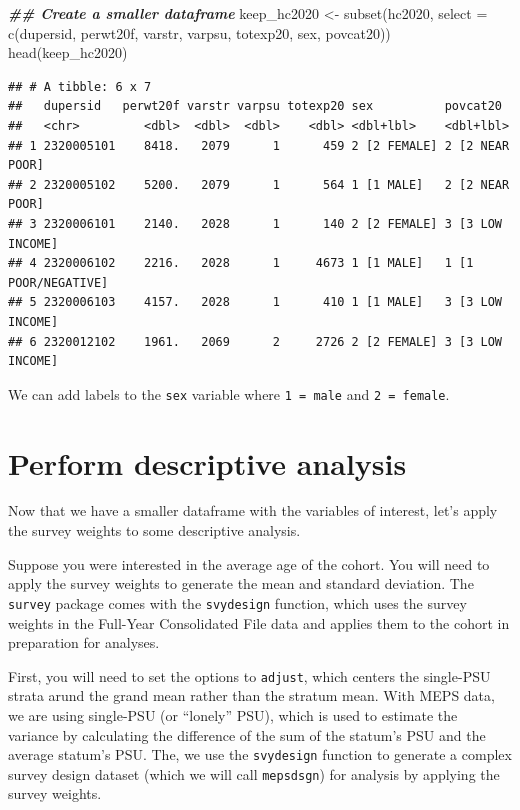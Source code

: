 \documentclass[
]{book}
\newenvironment{Shaded}{\begin{snugshade}}{\end{snugshade}}
\newcommand{\AttributeTok}[1]{\textcolor[rgb]{0.77,0.63,0.00}{#1}}
\newcommand{\DocumentationTok}[1]{\textcolor[rgb]{0.56,0.35,0.01}{\textbf{\textit{#1}}}}
\newcommand{\FunctionTok}[1]{\textcolor[rgb]{0.00,0.00,0.00}{#1}}
\newcommand{\NormalTok}[1]{#1}
\newcommand{\OtherTok}[1]{\textcolor[rgb]{0.56,0.35,0.01}{#1}}
\theoremstyle{definition}
\theoremstyle{definition}
\theoremstyle{definition}
\theoremstyle{definition}
\theoremstyle{remark}
\begin{document}
\begin{Shaded}
\begin{Highlighting}[]
\DocumentationTok{\#\# Create a smaller dataframe}
\NormalTok{keep\_hc2020 }\OtherTok{\textless{}{-}} \FunctionTok{subset}\NormalTok{(hc2020, }\AttributeTok{select =} \FunctionTok{c}\NormalTok{(dupersid, perwt20f, varstr, varpsu, totexp20, sex, povcat20))}
\FunctionTok{head}\NormalTok{(keep\_hc2020)}
\end{Highlighting}
\end{Shaded}

\begin{verbatim}
## # A tibble: 6 x 7
##   dupersid   perwt20f varstr varpsu totexp20 sex          povcat20           
##   <chr>         <dbl>  <dbl>  <dbl>    <dbl> <dbl+lbl>    <dbl+lbl>          
## 1 2320005101    8418.   2079      1      459 2 [2 FEMALE] 2 [2 NEAR POOR]    
## 2 2320005102    5200.   2079      1      564 1 [1 MALE]   2 [2 NEAR POOR]    
## 3 2320006101    2140.   2028      1      140 2 [2 FEMALE] 3 [3 LOW INCOME]   
## 4 2320006102    2216.   2028      1     4673 1 [1 MALE]   1 [1 POOR/NEGATIVE]
## 5 2320006103    4157.   2028      1      410 1 [1 MALE]   3 [3 LOW INCOME]   
## 6 2320012102    1961.   2069      2     2726 2 [2 FEMALE] 3 [3 LOW INCOME]
\end{verbatim}

We can add labels to the \texttt{sex} variable where \texttt{1\ =\ male} and \texttt{2\ =\ female}.

\hypertarget{perform-descriptive-analysis}{%
\section{Perform descriptive analysis}\label{perform-descriptive-analysis}}

Now that we have a smaller dataframe with the variables of interest, let's apply the survey weights to some descriptive analysis.

Suppose you were interested in the average age of the cohort. You will need to apply the survey weights to generate the mean and standard deviation. The \texttt{survey} package comes with the \texttt{svydesign} function, which uses the survey weights in the Full-Year Consolidated File data and applies them to the cohort in preparation for analyses.

First, you will need to set the options to \texttt{adjust}, which centers the single-PSU strata arund the grand mean rather than the stratum mean. With MEPS data, we are using single-PSU (or ``lonely'' PSU), which is used to estimate the variance by calculating the difference of the sum of the statum's PSU and the average statum's PSU. The, we use the \texttt{svydesign} function to generate a complex survey design dataset (which we will call \texttt{mepsdsgn}) for analysis by applying the survey weights.
\end{document}
